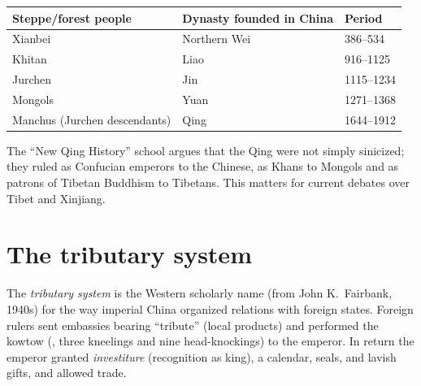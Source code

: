 \begin{center}
\begin{tabular}{lll}
\toprule
Steppe/forest people & Dynasty founded in China & Period \\
\midrule
Xianbei & Northern Wei & 386--534 \\
Khitan & Liao & 916--1125 \\
Jurchen & Jin & 1115--1234 \\
Mongols & Yuan & 1271--1368 \\
Manchus (Jurchen descendants) & Qing & 1644--1912 \\
\bottomrule
\end{tabular}
\end{center}

\begin{remark}
The ``New Qing History'' school argues that the Qing were not simply sinicized; they ruled
as Confucian emperors to the Chinese, as Khans to Mongols and as patrons of Tibetan
Buddhism to Tibetans. This matters for current debates over Tibet and Xinjiang.
\end{remark}

\section{The tributary system}

\begin{definition}
The \emph{tributary system} is the Western scholarly name (from John K.\ Fairbank, 1940s)
for the way imperial China organized relations with foreign states. Foreign rulers sent
embassies bearing ``tribute'' (local products) and performed the kowtow (, three
kneelings and nine head-knockings) to the emperor. In return the emperor granted
\emph{investiture} (recognition as king), a calendar, seals, and lavish gifts, and allowed
trade.
\end{definition}

